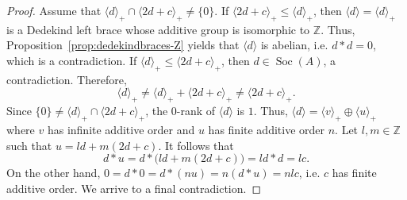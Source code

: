 \documentclass[10pt,a4paper]{amsart}
\DeclareMathOperator{\Soc}{Soc}
\begin{document}
\begin{proof}
Assume that $\langle d \rangle_+ \cap \langle 2d+c\rangle_+ \neq \{0\}$. If $\langle 2d + c \rangle_+ \leq \langle d \rangle_+$, then $\langle d \rangle = \langle d \rangle_+$ is a Dedekind left brace whose additive group is isomorphic to $\mathbb{Z}$. Thus, Proposition~\ref{prop:dedekindbraces-Z} yields that $\langle d \rangle$ is abelian, i.e. $d \ast d = 0$, which is a contradiction. If $\langle d \rangle_+ \leq \langle 2d +c \rangle_+$, then $d \in \Soc(A)$, a contradiction. Therefore, 
\[ \langle d \rangle_+ \neq \langle d \rangle_+ + \langle 2d+c \rangle_+ \neq \langle 2d+c \rangle_+.\] Since $\{0\} \neq \langle d \rangle_+ \cap \langle 2d+c \rangle_+$, the $0$-rank of $\langle d \rangle$ is $1$. Thus, $ \langle d \rangle = \langle v \rangle_+ \oplus \langle u \rangle_+$ where $v$ has infinite additive order and $u$ has finite additive order $n$. Let $l,m \in \mathbb{Z}$ such that  $u = ld + m(2d+c)$. It follows that
\[ d \ast u = d \ast \big(ld+ m(2d+c)\big) = ld \ast d = lc.\]
On the other hand,  $0 = d \ast 0 = d \ast(nu) = n(d\ast u) = nlc$, i.e. $c$ has finite additive order. We arrive to a final contradiction. 
\end{proof}
\end{document}
